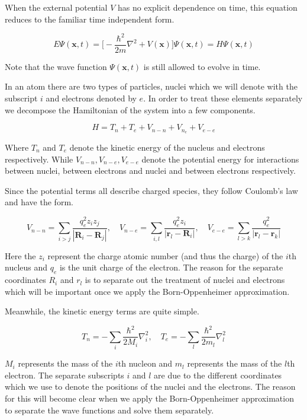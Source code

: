 When the external potential $V$ has no explicit dependence on time, this equation reduces to the familiar time independent form. 

\begin{equation}
	E \Psi (\textbf{x}, t) = \big[ -\frac{\hbar ^2}{2m}\nabla^2 + V (\textbf{x}) \big] \Psi (\textbf{x}, t) = H \Psi(\textbf{x}, t) 
 \end{equation}

Note that the wave function $\Psi (\textbf {x}, t)$ is still allowed to evolve in time. 

In an atom there are two types of particles, nuclei which we will denote with the subscript $i$ and electrons denoted by $e$. In order to treat these elements separately we decompose the Hamiltonian of the system into a few components. 

\begin {equation}
H = T_n + T_e + V_{n-n} + V_{n_e} + V_{e-e}
\end{equation}

Where $T_n$ and $T_e$ denote the kinetic energy of the nucleus and electrons respectively. While $V_{n-n}, V_{n-e}, V_{e-e}$ denote the potential energy for interactions between nuclei, between electrons and nuclei and between electrons respectively.

Since the potential terms all describe charged species, they follow Coulomb's law and have the form.

\begin{equation}
	V_{n-n} = \sum_{i>j} \frac{q_e^2 z_i z_j }{|\textbf{R}_i-\textbf{R}_j|},\quad V_{n-e} = \sum_{i,l} \frac{q_e^2 z_i }{|\textbf{r}_l-\textbf{R}_i|},\quad  V_{e-e}  = \sum_{l>k} \frac{q_e^2 }{|\textbf{r}_l-\textbf{r}_k|}
\end{equation}

Here the $z_i$ represent the charge atomic number (and thus the charge) of the $i$th nucleus and $q_e$ is the unit charge of the electron. The reason for the separate coordinates $R_i$ and $r_l$ is to separate out the treatment of nuclei and electrons which will be important once we apply the Born-Oppenheimer approximation.

Meanwhile, the kinetic energy terms are quite simple. 

\begin {equation}
T_n = - \sum_i \frac{\hbar^2}{2M_i} \nabla_i ^2,\quad  T_e = - \sum_l \frac{\hbar^2}{2m_l} \nabla_l ^2
\end {equation}

$M_i$ represents the mass of the $i$th nucleon and $m_l$ represents the mass of the $l$th electron. The separate subscripts $i$ and $l$ are due to the different coordinates which we use to denote the positions of the nuclei and the electrons. The reason for this will become clear when we apply the Born-Oppenheimer approximation to separate the wave functions and solve them separately.

